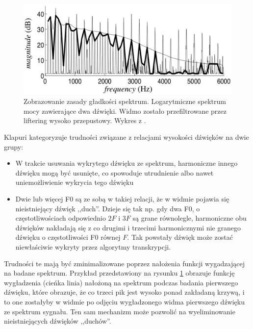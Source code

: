 \documentclass[12pt,a4paper,twoside]{mwart}
\begin{document}
\begin{figure}[ht]
  \begin{center}
    \includegraphics[scale=0.38]{images/spectral_smoothnes_kapuri.jpg}
    \caption{Zobrazowanie zasady gładkości spektrum. Logarytmiczne spektrum mocy zawierające dwa dźwięki. Widmo zostało przefiltrowane przez liftering wysoko przepustowy. Wykres z \cite[3383]{Transcription:Klapuri:MultipitchEstimationAndSeparation}.}
    \label{fig:specSmooth:kapuri}
  \end{center}
\end{figure}

Klapuri kategoryzuje trudności związane z relacjami wysokości dźwięków na dwie grupy:
\begin{itemize}
\item W trakcie usuwania wykrytego dźwięku ze spektrum, harmoniczne innego dźwięku mogą być usunięte, co spowoduje utrudnienie albo nawet uniemożliwienie wykrycia tego dźwięku
\item Dwie lub więcej F0 są ze sobą w takiej relacji, że w widmie pojawia się nieistniejący dźwięk ,,duch''. Dzieje się tak np. gdy dwa F0, o częstotliwościach odpowiednio $2F$ i $3F$ są grane równolegle, harmoniczne obu dźwięków nakładają się z co drugimi i trzecimi harmonicznymi nie granego dźwięku o częstotliwości F0 równej $F$. Tak powstały dźwięk może zostać niewłaściwie wykryty przez algorytmy transkrypcji.
\end{itemize}
Trudności te mają być zminimalizowane poprzez nałożenia funkcji wygadzającej na badane spektrum. Przykład przedstawiony na rysunku \ref{fig:specSmooth:kapuri} obrazuje funkcję wygładzenia (cieńka linia) nałożoną na spektrum podczas badania pierwszego dźwięku, które obrazuje, że co trzeci pik jest wysoko ponad zakładaną krzywą, i to one zostałyby w widmie po odjęciu wygładzonego widma pierwszego dźwięku ze spektrum sygnału. Ten sam mechanizm może pozwolić na wyeliminowanie nieistniejących dźwięków ,,duchów''.
\end{document}
